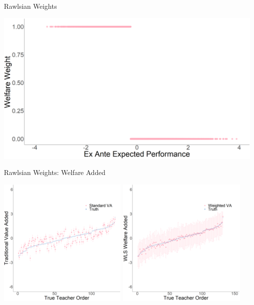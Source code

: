 \documentclass[t,aspectratio=169,11pt]{beamer}
\begin{document}

\begin{frame}{Rawlsian Weights}

\centering

\includegraphics[width=.85\linewidth]{slides/Figures/rawlsian_weight.png}

\end{frame}


\begin{frame}{Rawlsian Weights: Welfare Added} 

\centering
 \includegraphics[width=0.475\textwidth]{slides/Figures/standard_rawlsian_caterpillar.png}
  \includegraphics[width=0.475\textwidth]{slides/Figures/ww_rawlsian_caterpillar.png}
\end{frame}
\end{document}
